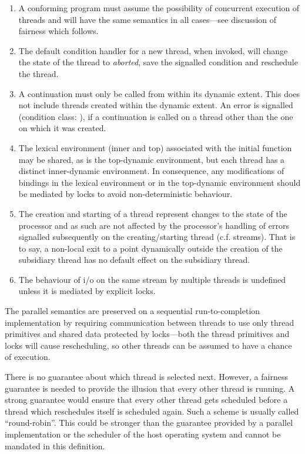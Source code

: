 \begin{optDefinition}
\begin{enumerate}
    \item A conforming program must assume the possibility of concurrent
    execution of threads and will have the same semantics in all cases---see
    discussion of fairness which follows.

    \item The default condition handler for a new thread, when invoked, will
    change the state of the thread to {\it aborted}, save the signalled
    condition and reschedule the thread.

    \item A continuation must only be called from within its dynamic extent.
    This does not include threads created within the dynamic extent.  An error
    is signalled (condition class:
    ),
    if a continuation is called on a thread other than the one on which it was
    created.

    \item The lexical environment (inner and top) associated with the initial
    function may be shared, as is the top-dynamic environment, but each thread
    has a distinct inner-dynamic environment.  In consequence, any modifications
    of bindings in the lexical environment or in the top-dynamic environment
    should be mediated by locks to avoid non-deterministic behaviour.

    \item The creation and starting of a thread represent changes to the state
    of the processor and as such are not affected by the processor's handling of
    errors signalled subsequently on the creating/starting thread
    (c.f. streams).  That is to say, a non-local exit to a point dynamically
    outside the creation of the subsidiary thread has no default effect on the
    subsidiary thread.

    \item The behaviour of i/o on the same stream by multiple threads is
    undefined unless it is mediated by explicit locks.
\end{enumerate}

The parallel semantics are preserved on a sequential run-to-completion
implementation by requiring communication between threads to use only
thread primitives and shared data protected by locks---both the
thread primitives and locks will cause rescheduling, so other
threads can be assumed to have a chance of execution.

There is no guarantee about which thread is selected next.  However, a
fairness guarantee is needed to provide the illusion that every other
thread is running.  A strong guarantee would ensure that every other
thread gets scheduled before a thread which reschedules itself is
scheduled again.  Such a scheme is usually called ``round-robin''.
This could be stronger than the guarantee provided by a parallel
implementation or the scheduler of the host operating system and
cannot be mandated in this definition.


\end{optDefinition}

